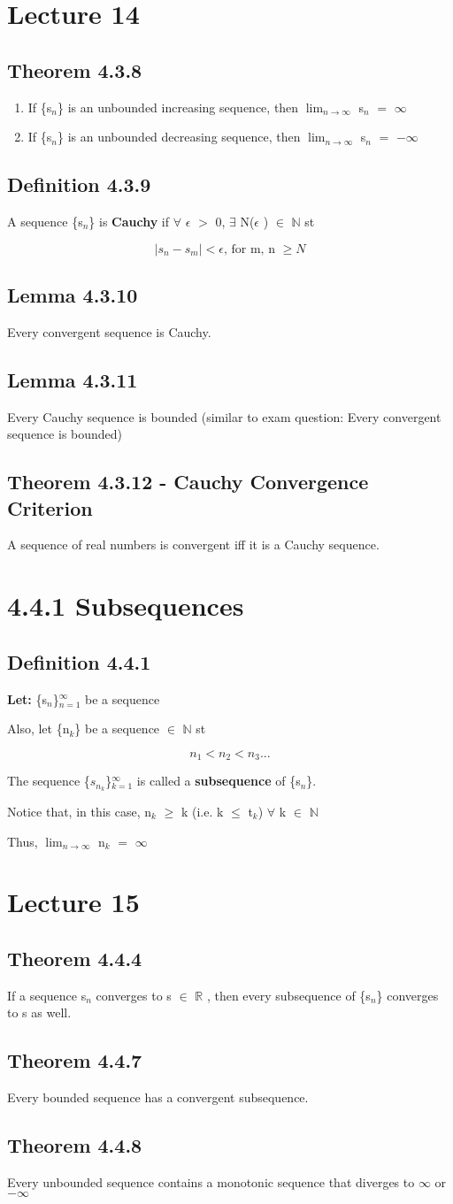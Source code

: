 \documentclass{article}
\newcommand{\mt}[1]{\ensuremath{#1}}
\newcommand\bsc[2][\DefaultOpt]{%
  \def\DefaultOpt{#2}%
  \section[#1]{#2}%
}
\newcommand\ssc[2][\DefaultOpt]{%
  \def\DefaultOpt{#2}%
  \subsection[#1]{#2}%
}
\newcommand{\balist}{\begin{enumerate}[label=\alph*.]}
\newcommand{\elist}{\end{enumerate}}
\newcommand{\lt}[1]{\textbf{Let: } #1}
\newcommand{\dbs}[3]{\mt{#1_{#2_#3}}}
\newcommand{\br}{\mt{\mathbb{R}} }       %
\newcommand{\bn}{\mt{\mathbb{N}} }       %
\newcommand{\ep}{\mt{\epsilon} }         %
\newcommand{\fa}{\mt{\forall} }          %
\newcommand{\mem}{\mt{\in} }
\newcommand{\exs}{\mt{\exists} }
\newcommand{\bk}[1]{\{#1\}}
\newcommand{\gr}{\mt{>} }
\newcommand{\lse}{\mt{\leq} }
\newcommand{\gre}{\mt{\geq} }
\newcommand{\eql}{\mt{=} }
\newcommand{\uw}[2]{#1\mt{_{#2}}}
\newcommand{\lmti}[1]{\mt{\displaystyle{\lim_{#1 \to \infty}}}}
\newcommand{\eqn}[1]{\[#1\]}
\newcommand{\infy}{\mt{\infty} }
\begin{document}
\newpage

\bsc{Lecture 14}{

\ssc{Theorem 4.3.8}{

\balist
\item If \bk{\uw{s}{n}} is an unbounded increasing sequence, then \lmti{n} \uw{s}{n} \eql $\infty$
\item If \bk{\uw{s}{n}} is an unbounded decreasing sequence, then \lmti{n} \uw{s}{n} \eql $-\infty$
\elist

}

\ssc{Definition 4.3.9}{

A sequence \bk{\uw{s}{n}} is \textbf{Cauchy} if \fa \ep \gr 0, \exs N(\ep) \mem \bn st

\eqn{|s_n - s_m| < \ep\textrm{, for m, n }\gre N}

}

\ssc{Lemma 4.3.10}{

Every convergent sequence is Cauchy.

}

\ssc{Lemma 4.3.11}{

Every Cauchy sequence is bounded (similar to exam question: Every convergent sequence is bounded)

}

\ssc{Theorem 4.3.12 - Cauchy Convergence Criterion}{

A sequence of real numbers is convergent iff it is a Cauchy sequence.

}

\bsc{4.4.1 Subsequences}{

\ssc{Definition 4.4.1}{

\lt{\bk{\uw{s}{n}}$^\infty_{n = 1}$ be a sequence}

Also, let \bk{\uw{n}{k}} be a sequence \mem \bn st

\eqn{n_1 < n_2 < n_3 ...}

The sequence \bk{\dbs{s}{n}{k}}$^\infty_{k = 1}$ is called a \textbf{subsequence} of \bk{\uw{s}{n}}.

Notice that, in this case, \uw{n}{k} \gre k (i.e. k \lse \uw{t}{k}) \fa k \mem \bn

Thus, \lmti{n} \uw{n}{k} \eql $\infty$
}
}

}

\newpage

\bsc{Lecture 15}{

\ssc{Theorem 4.4.4}{

If a sequence \uw{s}{n} converges to s \mem \br, then every subsequence of \bk{\uw{s}{n}} converges to s as well.
}

\ssc{Theorem 4.4.7}{

Every bounded sequence has a convergent subsequence.

}

\ssc{Theorem 4.4.8}{

Every unbounded sequence contains a monotonic sequence that diverges to \infy or $-$\infy 

}

}
\end{document}
